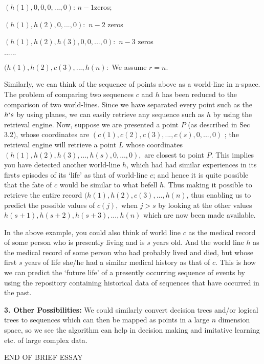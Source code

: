 \documentclass[english]{article}
\begin{document}
$(h(1),0,0,0,...,0)$:\qquad{}\qquad{} $n-1$zeros;

$(h(1),h(2),0,...,0):$\qquad{}\qquad{} $n-2$ zeros

$(h(1),h(2),h(3),0,0,...,0):$\qquad{}\qquad{} $n-3$ zeros

$......$

$(h(1),h(2),c(3),...,h(n):$\qquad{}\qquad{} We assume $r=n$.

\medskip{}


Similarly, we can think of the sequence of points above as a world-line
in n-space. The problem of comparing two sequences $c$ and $h$ has
been reduced to the comparison of two world-lines. Since we have separated
every point such as the $h`s$ by using
planes, we can easily retrieve any sequence such as $h$ by using
the retrieval engine. Now, suppose we are presented a point $P$ (as
described in Sec 3.2), whose coordinates are $(c(1),c(2),c(3),...,c(s),0,...,0)$
; the retrieval engine will retrieve a point $L$ whose coordinates
$(h(1),h(2),h(3),...,h(s),0,...,0),$
are closest to point $P$. This implies you have detected another
world-line $h$, which had had similar experiences in its first$s$
episodes of its `life' as that of world-line $c$; and hence it is
quite possible that the fate of $c$ would be similar to what befell
$h.$ Thus making it possible to retrieve the entire record $(h(1),h(2),c(3),...,h(n)$,
thus enabling us to predict the possible values of $c(j),$ when $j>s$
by looking at the other values $h(s+1),h(s+2),h(s+3),...,h(n)$
which are now been made available. 

\medskip{}


In the above example, you could also think of world line $c$ as the
medical record of some person who is presently living and is $s$
years old. And the world line $h$ as the medical record of some person
who had probably lived and died, but whose first $s$ years of life she/he
had a similar medical history as that of $c$. This is how we can
predict the `future life' of a presently occurring sequence of events
by using the repository containing historical data of sequences that
have occurred in the past.

\medskip{}


\textbf{\large 3. Other Possibilities:} We could similarly convert
decision trees and/or logical trees to sequences which can then be
mapped as points in a large $n$ dimension space, so we see the algorithm
can help in decision making and imitative learning etc. of large complex
data.

\medskip{}


END OF BRIEF ESSAY 
\end{document}

